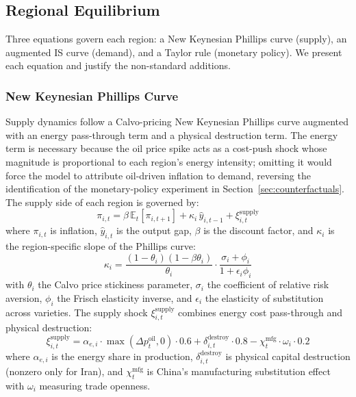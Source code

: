 \documentclass[12pt]{article}
\begin{document}
\subsection{Regional Equilibrium}

Three equations govern each region: a New Keynesian Phillips curve (supply), an augmented IS curve (demand), and a Taylor rule (monetary policy). We present each equation and justify the non-standard additions.

\subsubsection{New Keynesian Phillips Curve}

Supply dynamics follow a Calvo-pricing New Keynesian Phillips curve augmented with an energy pass-through term and a physical destruction term. The energy term is necessary because the oil price spike acts as a cost-push shock whose magnitude is proportional to each region's energy intensity; omitting it would force the model to attribute oil-driven inflation to demand, reversing the identification of the monetary-policy experiment in Section~\ref{sec:counterfactuals}. The supply side of each region is governed by:
\begin{equation}
\pi_{i,t} = \beta \, \mathbb{E}_t[\pi_{i,t+1}] + \kappa_i \, \hat{y}_{i,t-1} + \xi^{\text{supply}}_{i,t}
\label{eq:nkpc}
\end{equation}
where $\pi_{i,t}$ is inflation, $\hat{y}_{i,t}$ is the output gap, $\beta$ is the discount factor, and $\kappa_i$ is the region-specific slope of the Phillips curve:
\begin{equation}
\kappa_i = \frac{(1-\theta_i)(1-\beta\theta_i)}{\theta_i} \cdot \frac{\sigma_i + \phi_i}{1 + \epsilon_i \phi_i}
\label{eq:kappa}
\end{equation}
with $\theta_i$ the Calvo price stickiness parameter, $\sigma_i$ the coefficient of relative risk aversion, $\phi_i$ the Frisch elasticity inverse, and $\epsilon_i$ the elasticity of substitution across varieties. The supply shock $\xi^{\text{supply}}_{i,t}$ combines energy cost pass-through and physical destruction:
\begin{equation}
\xi^{\text{supply}}_{i,t} = \alpha_{e,i} \cdot \max(\Delta p^{\text{oil}}_t, 0) \cdot 0.6 + \delta^{\text{destroy}}_{i,t} \cdot 0.8 - \chi^{\text{mfg}}_t \cdot \omega_i \cdot 0.2
\label{eq:supply_shock}
\end{equation}
where $\alpha_{e,i}$ is the energy share in production, $\delta^{\text{destroy}}_{i,t}$ is physical capital destruction (nonzero only for Iran), and $\chi^{\text{mfg}}_t$ is China's manufacturing substitution effect with $\omega_i$ measuring trade openness.
\end{document}

